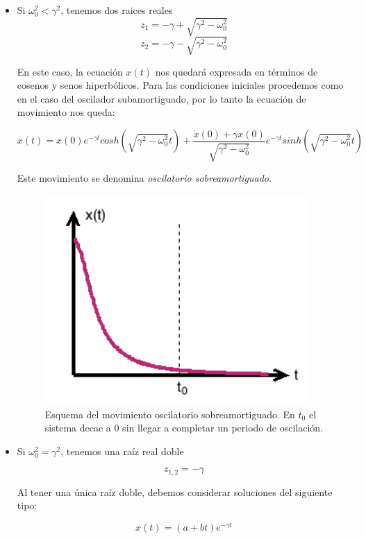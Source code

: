 \documentclass[a4paper,12pt]{article}
\begin{document}
\begin{itemize}
\item Si $\omega_0^2 < \gamma^2$, tenemos dos raices reales
$$z_{1} = -\gamma + \sqrt{\gamma^2 - \omega_0^2}$$  $$z_{2} = -\gamma - \sqrt{\gamma^2 - \omega_0^2}$$


En este caso, la ecuaci\'on $x(t)$ nos quedar\'a expresada en t\'erminos de cosenos y senos hiperb\'olicos. Para las condiciones iniciales procedemos como en el caso del oscilador subamortiguado, por lo tanto la ecuaci\'on de movimiento nos queda:

\begin{equation}
x(t) = x(0)e^{-\gamma t}cosh(\sqrt{\gamma^2 - \omega_0^2}t) + \frac{\dot{x}(0) + \gamma x(0)}{\sqrt{\gamma^2 - \omega_0^2}}e^{-\gamma t}sinh(\sqrt{\gamma^2 - \omega_0^2}t)
\end{equation}

Este movimiento se denomina \textit{oscilatorio sobreamortiguado}.

\begin{figure}[H]
\begin{center}
\includegraphics[height=8cm]{oscilacion_sobreamortiguada.jpg}
\caption[width=5cm]{Esquema del movimiento oscilatorio sobreamortiguado. En $t_{0}$ el sistema decae a 0 sin llegar a completar un periodo de oscilaci\'on.}
\end{center}
\end{figure}


\item Si $\omega_0^2 = \gamma^2$, tenemos una ra\'iz real doble

$$z_{1,2} = -\gamma$$

Al tener una \'unica ra\'iz doble, debemos considerar soluciones del siguiente tipo: 

$$ x(t) = (a+bt)e^{-\gamma t}$$


\end{itemize}
\end{document}

